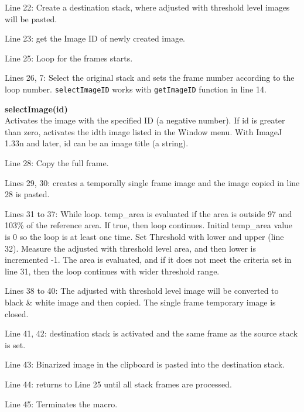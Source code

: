 \documentclass[11pt,a4paper,oneside]{report}
\newenvironment{indentCom}%
{\begin{list}{}%
         {\setlength{\leftmargin}{1em}}%
         \item[]%
}
{\end{list}}
\newcommand{\ilcom}[1]{\texttt{\small#1}}
\begin{document}
\begin{itemize}
\item Line 22: Create a destination stack, where adjusted with threshold level images will be pasted. 

\item Line 23: get the Image ID of newly created image. 

\item Line 25: Loop for the frames starts. 

\item Lines 26, 7: Select the original stack and sets the frame number according to the loop number. \ilcom{selectImageID} works with \ilcom{getImageID} function in line 14. 


\begin{indentCom}
\textbf{selectImage(id)}\\
Activates the image with the specified ID (a negative number). If id is greater than zero, activates the idth image listed in the Window menu. With ImageJ 1.33n and later, id can be an image title (a string).
\end{indentCom}

\item Line 28: Copy the full frame.

\item Lines 29, 30: creates a temporally single frame image and the image copied in line 28 is pasted. 

\item Lines 31 to 37: While loop. temp\_area is evaluated if the area is outside 97 and 103\% of the reference area. If true, then loop continues. Initial temp\_area value is 0 so the loop is at least one time. Set Threshold with lower and upper (line 32). Measure the adjusted with threshold level area, and then lower is incremented -1. The area is evaluated, and if it does not meet the criteria set in line 31, then the loop continues with wider threshold range. 

\item Lines 38 to 40: The adjusted with threshold level image will be converted to black \& white image and then copied. The single frame temporary image is closed.

\item Line 41, 42: destination stack is activated and the same frame as the source stack is set. 

\item Line 43: Binarized image in the clipboard is pasted into the destination stack.

\item Line 44: returns to Line 25 until all stack frames are processed.

\item Line 45: Terminates the macro. 
\end{itemize}
\end{document}
